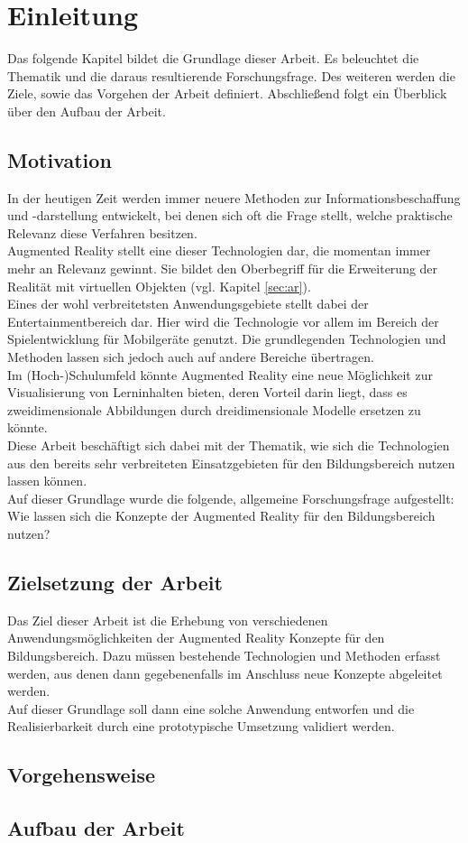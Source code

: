\chapter{Einleitung}\label{chapter:einleitung}
Das folgende Kapitel bildet die Grundlage dieser Arbeit. Es beleuchtet die Thematik und die daraus resultierende Forschungsfrage. Des weiteren werden die Ziele, sowie das Vorgehen der Arbeit definiert. Abschließend folgt ein Überblick über den Aufbau der Arbeit.

\section{Motivation}\label{sec:motivation}
In der heutigen Zeit werden immer neuere Methoden zur Informationsbeschaffung und -darstellung entwickelt, bei denen sich oft die Frage stellt, welche praktische Relevanz diese Verfahren besitzen. \\
Augmented Reality stellt eine dieser Technologien dar, die momentan immer mehr an Relevanz gewinnt. Sie bildet den Oberbegriff für die Erweiterung der Realität mit virtuellen Objekten (vgl. Kapitel \ref{sec:ar}). \\
Eines der wohl verbreitetsten Anwendungsgebiete stellt dabei der Entertainmentbereich dar. Hier wird die Technologie vor allem im Bereich der Spielentwicklung für Mobilgeräte genutzt. Die grundlegenden Technologien und Methoden lassen sich jedoch auch auf andere Bereiche übertragen. \\
Im (Hoch-)Schulumfeld könnte Augmented Reality eine neue Möglichkeit zur Visualisierung von Lerninhalten bieten, deren Vorteil darin liegt, dass es zweidimensionale Abbildungen durch dreidimensionale Modelle ersetzen zu könnte. \\
Diese Arbeit beschäftigt sich dabei mit der Thematik, wie sich die Technologien aus den bereits sehr verbreiteten Einsatzgebieten für den Bildungsbereich nutzen lassen können. \\
Auf dieser Grundlage wurde die folgende, allgemeine Forschungsfrage aufgestellt:\\
\glqq Wie lassen sich die Konzepte der Augmented Reality für den Bildungsbereich nutzen?\grqq

\section{Zielsetzung der Arbeit}\label{sec:ziele}
Das Ziel dieser Arbeit ist die Erhebung von verschiedenen Anwendungsmöglichkeiten der Augmented Reality Konzepte für den Bildungsbereich. Dazu müssen bestehende Technologien und Methoden erfasst werden, aus denen dann gegebenenfalls im Anschluss neue Konzepte abgeleitet werden. \\
Auf dieser Grundlage soll dann eine solche Anwendung entworfen und die Realisierbarkeit durch eine prototypische Umsetzung validiert werden.

\section{Vorgehensweise}

\section{Aufbau der Arbeit}
